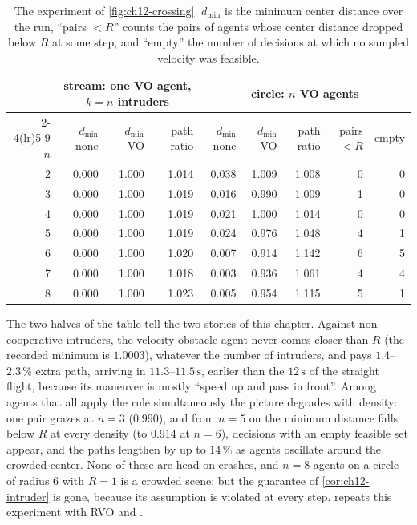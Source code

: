 \begin{table}[tb]
  \centering\footnotesize
  \setlength{\tabcolsep}{4pt}
  \caption{The experiment of \cref{fig:ch12-crossing}. $d_{\min}$ is the minimum
  center distance over the run, ``pairs $<R$'' counts the pairs of agents whose
  center distance dropped below $R$ at some step, and ``empty'' the number of
  decisions at which no sampled velocity was feasible.}
  \label{tab:ch12-crossing}
  \begin{tabular}{@{}r rrr rrrrr@{}}
  \toprule
  & \multicolumn{3}{c}{stream: one VO agent, $k=n$ intruders} & \multicolumn{5}{c}{circle: $n$ VO agents}\\
  \cmidrule(lr){2-4}\cmidrule(lr){5-9}
  $n$ & $d_{\min}$ none & $d_{\min}$ VO & path ratio & $d_{\min}$ none & $d_{\min}$ VO & path ratio & pairs $<R$ & empty\\
  \midrule
  2 & 0.000 & 1.000 & 1.014 & 0.038 & 1.009 & 1.008 & 0 & 0\\
  3 & 0.000 & 1.000 & 1.019 & 0.016 & 0.990 & 1.009 & 1 & 0\\
  4 & 0.000 & 1.000 & 1.019 & 0.021 & 1.000 & 1.014 & 0 & 0\\
  5 & 0.000 & 1.000 & 1.019 & 0.024 & 0.976 & 1.048 & 4 & 1\\
  6 & 0.000 & 1.000 & 1.020 & 0.007 & 0.914 & 1.142 & 6 & 5\\
  7 & 0.000 & 1.000 & 1.018 & 0.003 & 0.936 & 1.061 & 4 & 4\\
  8 & 0.000 & 1.000 & 1.023 & 0.005 & 0.954 & 1.115 & 5 & 1\\
  \bottomrule
  \end{tabular}
\end{table}

The two halves of the table tell the two stories of this chapter. Against
non-cooperative intruders, the velocity-obstacle agent never comes closer
than $R$ (the recorded minimum is $1.0003$), whatever the number of intruders,
and pays $1.4$--$2.3\,\%$ extra path, arriving in $11.3$--$11.5\,\mathrm{s}$,
earlier than the $12\,\mathrm{s}$ of the straight flight, because its
maneuver is mostly ``speed up and pass in front''. Among agents that all
apply the rule simultaneously the picture degrades with density: one pair
grazes at $n = 3$ ($0.990$), and from $n = 5$ on the minimum distance falls
below $R$ at every density (to $0.914$ at $n = 6$), decisions with an empty
feasible set appear, and the paths lengthen by up to $14\,\%$ as agents
oscillate around the crowded center. None of these are head-on
crashes, and $n = 8$ agents on a circle of radius $6$ with $R = 1$ is a
crowded scene; but the guarantee of \cref{cor:ch12-intruder} is gone, because
its assumption is violated at every step.  repeats this
experiment with RVO and \orca.

